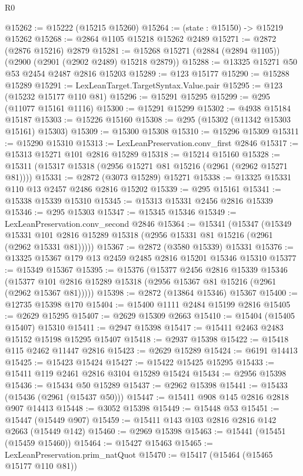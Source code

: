 \begin{lexlean}{R0}
\begin{coremodule}
@15262 := @15222 (@15215 @15260)
@15264 := (state : @15150) -> @15219 @15262
@15268 := @2864 @1105 @15218 @15262 @2489
@15271 := @2872 (@2876 @15216) @2879
@15281 := @15268 @15271 (@2884 (@2894 @1105)) (@2900 (@2901 (@2902 @2489) @15218 @2879))
@15288 := @13325 @15271 @50 @53 @2454 @2487 @2816 @15203
@15289 := @123 @15177
@15290 := @15288 @15289
@15291 := LexLeanTarget.TargetSyntax.Value.pair
@15295 := @123 (@15232 @15177 @110 @81)
@15296 := @15291 @15295
@15299 := @295 (@11077 @15161 @1116)
@15300 := @15291 @15299
@15302 := @4938 @15184 @15187
@15303 := @15226 @15160
@15308 := @295 (@15302 (@11342 @15303 @15161) @15303)
@15309 := @15300 @15308
@15310 := @15296 @15309
@15311 := @15290 @15310
@15313 := LexLeanPreservation.conv_first @2846
@15317 := @15313 @15271 @101 @2816 @15289
@15318 := @15214 @15160
@15328 := @15311 (@15317 @15318 (@2956 @15271 @81 @15216 (@2961 (@2962 @15271 @81))))
@15331 := @2872 (@3073 @15289) @15271
@15338 := @13325 @15331 @110 @13 @2457 @2486 @2816 @15202
@15339 := @295 @15161
@15341 := @15338 @15339 @15310
@15345 := @15313 @15331 @2456 @2816 @15339
@15346 := @295 @15303
@15347 := @15345 @15346
@15349 := LexLeanPreservation.conv_second @2846
@15364 := @15341
    (@15347
      (@15349 @15331 @101 @2816 @15289 @15318 (@2956 @15331 @81 @15216 (@2961 (@2962 @15331 @81)))))
@15367 := @2872 (@3580 @15339) @15331
@15376 := @13325 @15367 @179 @13 @2459 @2485 @2816 @15201 @15346 @15310
@15377 := @15349 @15367
@15395 := @15376
    (@15377
      @2456
      @2816
      @15339
      @15346
      (@15377 @101 @2816 @15289 @15318 (@2956 @15367 @81 @15216 (@2961 (@2962 @15367 @81)))))
@15398 := @2872 (@13864 @15346) @15367
@15400 := @12735 @15398 @170
@15404 := @15400 @1111 @2484 @15199 @2816
@15405 := @2629 @15295
@15407 := @2629 @15309 @2663
@15410 := @15404 (@15405 @15407) @15310
@15411 := @2947 @15398
@15417 := @15411 @2463 @2483 @15152 @15198 @15295 @15407
@15418 := @2937 @15398
@15422 := @15418 @115 @2462 @11447 @2816
@15423 := @2629 @15289
@15424 := @6191 @14413
@15425 := @15423 @15424
@15427 := @15422 @15425 @15295
@15433 := @15411 @119 @2461 @2816 @3104 @15289 @15424
@15434 := @2956 @15398
@15436 := @15434 @50 @15289
@15437 := @2962 @15398
@15441 := @15433 (@15436 (@2961 (@15437 @50)))
@15447 := @15411 @908 @145 @2816 @2818 @907 @14413
@15448 := @3052 @15398
@15449 := @15448 @53
@15451 := @15447 (@15449 @907)
@15459 := @15411 @143 @103 @2816 @2816 @142 @2663 (@15449 @142)
@15460 := @2969 @15398
@15463 := @15441 (@15451 (@15459 @15460))
@15464 := @15427 @15463
@15465 := LexLeanPreservation.prim_natQuot
@15470 := @15417 (@15464 (@15465 @15177 @110 @81))

\end{coremodule}
\end{lexlean}
